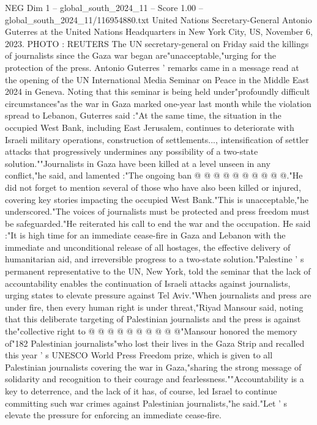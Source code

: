 \begin{textsample}{NEG Dim 1 – global\_south\_2024\_11 – Score 1.00 – global\_south\_2024\_11/116954880.txt}  \label{ex:f1_neg_277}
United Nations Secretary-General Antonio Guterres at the United Nations Headquarters in New York City, US, November 6, 2023.
PHOTO : REUTERS The UN secretary-general on Friday said the killings of journalists since the Gaza war began are"unacceptable,"urging for the protection of the press.
Antonio Guterres ' remarks came in a message read at the opening of the UN International Media Seminar on Peace in the Middle East 2024 in Geneva.
Noting that this seminar is being held under"profoundly difficult circumstances"as the war in Gaza marked one-year last month while the violation spread to Lebanon, Guterres said :"At the same time, the situation in the occupied West Bank, including East Jerusalem, continues to deteriorate with Israeli military operations, construction of settlements..., intensification of settler attacks that progressively undermines any possibility of a two-state solution.""Journalists in Gaza have been killed at a level unseen in any conflict,"he said, and lamented :"The ongoing ban @ @ @ @ @ @ @ @ @ @."He did not forget to mention several of those who have also been killed or injured, covering key stories impacting the occupied West Bank."This is unacceptable,"he underscored."The voices of journalists must be protected and press freedom must be safeguarded."He reiterated his call to end the war and the occupation.
He said :"It is high time for an immediate cease-fire in Gaza and Lebanon with the immediate and unconditional release of all hostages, the effective delivery of humanitarian aid, and irreversible progress to a two-state solution."Palestine ' s permanent representative to the UN, New York, told the seminar that the lack of accountability enables the continuation of Israeli attacks against journalists, urging states to elevate pressure against Tel Aviv."When journalists and press are under fire, then every human right is under threat,"Riyad Mansour said, noting that this deliberate targeting of Palestinian journalists and the press is against the"collective right to @ @ @ @ @ @ @ @ @ @"Mansour honored the memory of"182 Palestinian journalists"who lost their lives in the Gaza Strip and recalled this year ' s UNESCO World Press Freedom prize, which is given to all Palestinian journalists covering the war in Gaza,"sharing the strong message of solidarity and recognition to their courage and fearlessness.""Accountability is a key to deterrence, and the lack of it has, of course, led Israel to continue committing such war crimes against Palestinian journalists,"he said."Let ' s elevate the pressure for enforcing an immediate cease-fire.

\end{textsample}
